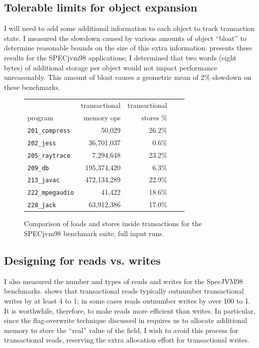 \subsection{Tolerable limits for object expansion}
I will need to add some additional information to each object to
track transaction state.  I measured the slowdown caused by various
amounts of object ``bloat'' to determine reasonable bounds on the
size of this extra information.   presents these
results for the SPECjvm98 applications; I determined that two words
(eight bytes) of additional storage per object would not impact
performance unreasonably.  This amount of bloat causes a geometric
mean of 2\% slowdown on these benchmarks.

\begin{figure}\sis%
\begin{center}
\begin{tabular}{lrrrr}
        & transactional & transactional\\
program & memory ops    & stores \% \\\hline
{\tt 201\_compress} & 50,029 & 26.2\% \\
{\tt 202\_jess} & 36,701,037 & 0.6\% \\
{\tt 205\_raytrace} & 7,294,648 & 23.2\% \\
{\tt 209\_db} & 195,374,420 & 6.3\% \\
{\tt 213\_javac} & 472,134,289 & 22.9\% \\
{\tt 222\_mpegaudio} & 41,422 & 18.6\% \\
{\tt 228\_jack} & 63,912,386 & 17.0\% \\
\end{tabular}
\end{center}
\caption{Comparison of loads and stores inside transactions for the
  SPECjvm98 benchmark suite, full input runs.}
\label{fig:writepercent}
\end{figure}
\subsection{Designing for reads vs. writes}
I also measured the number and types of reads and writes for the
SpecJVM98 benchmarks.
 shows that transactional reads typically
outnumber transactional writes by at least 4 to 1; in some cases reads
outnumber writes by over 100 to 1.  It is worthwhile, therefore, to
make reads more efficient than writes.  In particular, since the
flag-overwrite technique discussed in  requires us
to allocate additional memory to store the ``real'' value of the
field, I wish to avoid this process for transactional reads,
reserving the extra allocation effort for transactional writes.

